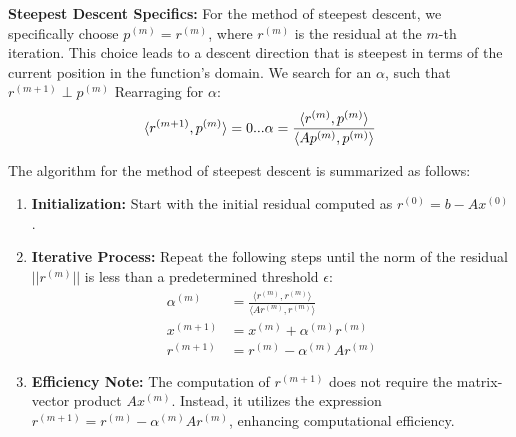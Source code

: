 \documentclass[unicode,11pt,a4paper,oneside,numbers=endperiod,openany]{scrartcl}
\begin{document}
\textbf{Steepest Descent Specifics:}
For the method of steepest descent, we specifically choose \( p^{(m)} = r^{(m)} \), where \( r^{(m)} \) is the residual at the \( m \)-th iteration. This choice leads to a descent direction that is steepest in terms of the current position in the function's domain.
\newline
We search for an $\alpha$, such that $r^{(m+1)} \perp p^{(m)}$ \newline
Rearraging for $\alpha$:\newline
\[
 \langle r^{(m+1)}, p^{(m)} \rangle = 0 \newline
 ... \newline
 \alpha = \frac{\langle r^{(m)}, p^{(m)} \rangle}{\langle Ap^{(m)}, p^{(m)} \rangle}
\]
\newline

The algorithm for the method of steepest descent is summarized as follows:

\begin{enumerate}
    \item \textbf{Initialization:} Start with the initial residual computed as \( r^{(0)} = b - Ax^{(0)} \).

    \item \textbf{Iterative Process:} Repeat the following steps until the norm of the residual \( ||r^{(m)}|| \) is less than a predetermined threshold \( \epsilon \):
    \begin{align*}
        \alpha^{(m)} &= \frac{\langle r^{(m)}, r^{(m)} \rangle}{\langle Ar^{(m)}, r^{(m)} \rangle} \\
        x^{(m+1)} &= x^{(m)} + \alpha^{(m)} r^{(m)} \\
        r^{(m+1)} &= r^{(m)} - \alpha^{(m)} Ar^{(m)}
    \end{align*}

    \item \textbf{Efficiency Note:} The computation of \( r^{(m+1)} \) does not require the matrix-vector product \( Ax^{(m)} \). Instead, it utilizes the expression \( r^{(m+1)} = r^{(m)} - \alpha^{(m)} Ar^{(m)} \), enhancing computational efficiency.
\end{enumerate}
\end{document}
